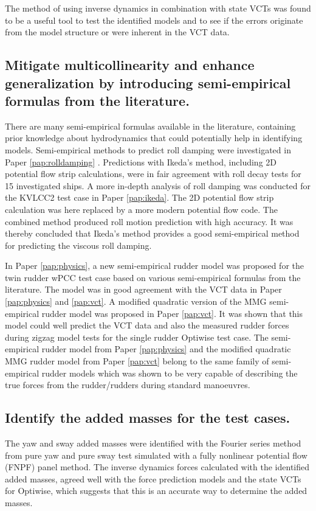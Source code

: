 The method of using inverse dynamics in combination with state VCTs was found to be a useful tool to test the identified models and to see if the errors originate from the model structure or were inherent in the VCT data. 

\subsection*{Mitigate multicollinearity and enhance generalization by introducing semi-empirical formulas from the literature.}
There are many semi-empirical formulas available in the literature, containing prior knowledge about hydrodynamics that could potentially help in identifying models.       
Semi-empirical methods to predict roll damping were investigated in Paper \ref{pap:rolldamping} . Predictions with Ikeda's method, including 2D potential flow strip calculations, were in fair agreement with roll decay tests for 15 investigated ships. 
A more in-depth analysis of roll damping was conducted for the KVLCC2 test case in Paper \ref{pap:ikeda}. The 2D potential flow strip calculation was here replaced by a more modern potential flow code. The combined method produced roll motion prediction with high accuracy. It was thereby concluded that Ikeda's method provides a good semi-empirical method for predicting the viscous roll damping.

In Paper \ref{pap:physics}, a new semi-empirical rudder model was proposed for the twin rudder wPCC test case based on various semi-empirical formulas from the literature. The model was in good agreement with the VCT data in Paper \ref{pap:physics} and \ref{pap:vct}. 
A modified quadratic version of the MMG semi-empirical rudder model was proposed in Paper \ref{pap:vct}. 
It was shown that this model could well predict the VCT data and also the measured rudder forces during zigzag model tests for the single rudder Optiwise test case. 
The semi-empirical rudder model from Paper \ref{pap:physics} and the modified quadratic MMG rudder model from Paper \ref{pap:vct} belong to the same family of semi-empirical rudder models which was shown to be very capable of describing the true forces from the rudder/rudders during standard manoeuvres.  

\subsection*{Identify the added masses for the test cases.}    
The yaw and sway added masses were identified with the Fourier series method \cite{sakamotoURANSSimulationsStatic2012} from pure yaw and pure sway test simulated with a fully nonlinear potential flow (FNPF) panel method. 
The inverse dynamics forces calculated with the identified added masses, agreed well with the force prediction models and the state VCTs for Optiwise, which suggests that this is an accurate way to determine the added masses. 




